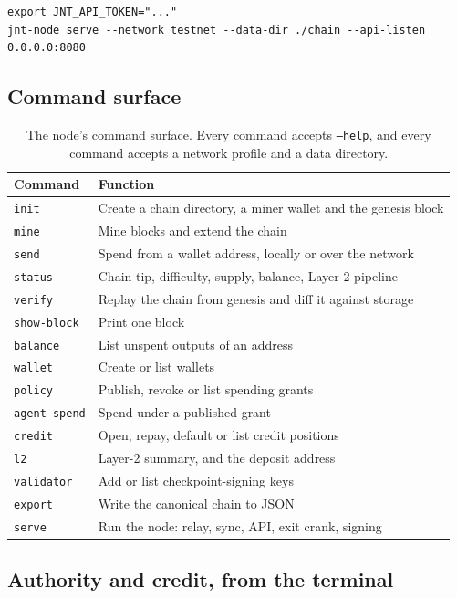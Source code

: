\documentclass{article}
\begin{document}
\begin{verbatim}
export JNT_API_TOKEN="..."
jnt-node serve --network testnet --data-dir ./chain --api-listen 0.0.0.0:8080
\end{verbatim}

\subsection{Command surface}

\begin{table}[t]
\centering
\begin{tabular}{ll}
\toprule
\textbf{Command} & \textbf{Function} \\
\midrule
\texttt{init} & Create a chain directory, a miner wallet and the genesis block \\
\texttt{mine} & Mine blocks and extend the chain \\
\texttt{send} & Spend from a wallet address, locally or over the network \\
\texttt{status} & Chain tip, difficulty, supply, balance, Layer-2 pipeline \\
\texttt{verify} & Replay the chain from genesis and diff it against storage \\
\texttt{show-block} & Print one block \\
\texttt{balance} & List unspent outputs of an address \\
\texttt{wallet} & Create or list wallets \\
\texttt{policy} & Publish, revoke or list spending grants \\
\texttt{agent-spend} & Spend under a published grant \\
\texttt{credit} & Open, repay, default or list credit positions \\
\texttt{l2} & Layer-2 summary, and the deposit address \\
\texttt{validator} & Add or list checkpoint-signing keys \\
\texttt{export} & Write the canonical chain to JSON \\
\texttt{serve} & Run the node: relay, sync, API, exit crank, signing \\
\bottomrule
\end{tabular}
\caption{The node's command surface. Every command accepts \texttt{--help}, and
every command accepts a network profile and a data directory.}
\label{tab:cli}
\end{table}

\subsection{Authority and credit, from the terminal}
\end{document}
